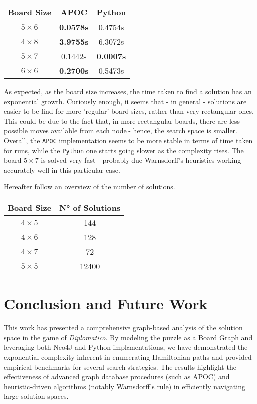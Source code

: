 \documentclass[conference]{IEEEtran}
\begin{document}
\begin{table}[ht]
\centering
\begin{tabular}{|c|c c|}
\hline
\textbf{Board Size} & \textbf{APOC} & \textbf{Python} \\ \hline
\textbf{$5 \times 6$} & \textbf{0.0578s} & 0.4754s \\ \hline
\textbf{$4 \times 8$} & \textbf{3.9755s} & 6.3072s \\ \hline
\textbf{$5 \times 7$} & 0.1442s & \textbf{0.0007s} \\ \hline
\textbf{$6 \times 6$} & \textbf{0.2700s} & 0.5473s \\ \hline
\end{tabular}
\end{table}

As expected, as the board size increases, the time taken to find a solution has an exponential growth.
Curiously enough, it seems that - in general - solutions are easier to be find for more 'regular' board sizes, rather than very rectangular ones.
This could be due to the fact that, in more rectangular boards, there are less possible moves available from each node - hence, the search space is smaller.
Overall, the \texttt{APOC} implementation seems to be more stable in terms of time taken for runs, while the \texttt{Python} one starts going slower as the complexity rises.
The board $5 \times 7$ is solved very fast - probably due Warnsdorff's heuristics working accurately well in this particular case.

Hereafter follow an overview of the number of solutions.

\begin{table}[ht]
	\centering
	\begin{tabular}{|c|c|}
		\hline
		\textbf{Board Size} & \textbf{N° of Solutions} \\ \hline
		\textbf{$4 \times 5$} & 144	\\ \hline
		\textbf{$4 \times 6$} & 128	\\ \hline
		\textbf{$4 \times 7$} & 72  \\ \hline
		\textbf{$5 \times 5$} & 12400 \\ \hline 
	\end{tabular}
\end{table}

\section{Conclusion and Future Work}
This work has presented a comprehensive graph-based analysis of the solution space in the game of \textit{Diplomatico}. By modeling the puzzle as a Board Graph and leveraging both Neo4J and Python implementations, we have demonstrated the exponential complexity inherent in enumerating Hamiltonian paths and provided empirical benchmarks for several search strategies. The results highlight the effectiveness of advanced graph database procedures (such as APOC) and heuristic-driven algorithms (notably Warnsdorff's rule) in efficiently navigating large solution spaces. 
\end{document}
